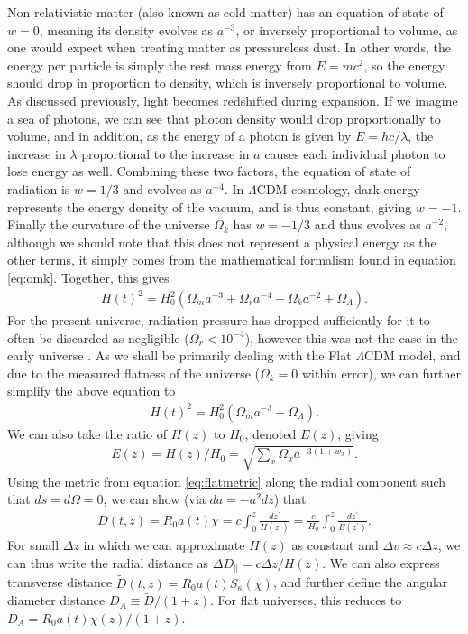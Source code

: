 \documentclass[titlesmallcaps, examinerscopy, copyrightpage]{uqthesis}
\begin{document}
Non-relativistic matter (also known as cold matter) has an equation of state of $w = 0$, meaning its density evolves as $a^{-3}$, or inversely proportional to volume, as one would expect when treating matter as pressureless dust. In other words, the energy per particle is simply the rest mass energy from $E=mc^2$, so the energy should drop in proportion to density, which is inversely proportional to volume. As discussed previously, light becomes redshifted during expansion. If we imagine a sea of photons, we can see that photon density would drop proportionally to volume, and in addition, as the energy of a photon is given by $E=hc/\lambda$, the increase in $\lambda$ proportional to the increase in $a$ causes each individual photon to lose energy as well. Combining these two factors, the equation of state of radiation is $w = 1/3$ and evolves as $a^{-4}$. In $\Lambda$CDM cosmology, dark energy represents the energy density of the vacuum, and is thus constant, giving $w = -1$. Finally the curvature of the universe $\Omega_k$ has $w=-1/3$ and thus evolves as $a^{-2}$, although we should note that this does not represent a physical energy as the other terms, it simply comes from the mathematical formalism found in equation \eqref{eq:omk}. Together, this gives
\begin{align} \label{eq:dynamics}
H(t)^2 = H_0^2 \left( \Omega_m a^{-3} + \Omega_r a^{-4} + \Omega_k a^{-2} + \Omega_\Lambda \right).
\end{align}
For the present universe, radiation pressure has dropped sufficiently for it to often be discarded as negligible ($\Omega_r < 10^{-4}$), however this was not the case in the early universe \citep{Planck201416, RydenPartridge2004}. As we shall be primarily dealing with the Flat $\Lambda$CDM model, and due to the measured flatness of the universe ($\Omega_k = 0$ within error), we can further simplify the above equation to
\begin{align}
H(t)^2 = H_0^2 \left( \Omega_m a^{-3} + \Omega_\Lambda \right).
\end{align}
We can also take the ratio of $H(z)$ to $H_0$, denoted $E(z)$, giving
\begin{align}
E(z) = H(z) / H_0 = \sqrt{\sum_x \Omega_x a^{-3(1+w_x)}}.
\end{align}
Using the metric from equation \eqref{eq:flatmetric} along the radial component such that $ds = d\Omega = 0$, we can show (via $da = -a^2 dz$) that 
\begin{align}
D(t,z) = R_0 a(t) \chi = c \int_0^z \frac{d z^\prime}{H(z^\prime)} = \frac{c}{H_0} \int_0^z \frac{dz^\prime}{E(z^\prime)}.
\end{align}
For small $\Delta z$ in which we can approximate $H(z)$ as constant and $\Delta v \approx c \Delta z$, we can thus write the radial distance as $\Delta D_\parallel = c\Delta z/H(z)$. We can also express transverse distance $\tilde{D}(t,z) = R_0 a(t) S_\kappa(\chi)$, and further define the angular diameter distance $D_A \equiv \tilde{D} / (1 + z)$. For flat universes, this reduces to $D_A = R_0 a(t) \chi(z) / (1 + z)$.
\end{document}
